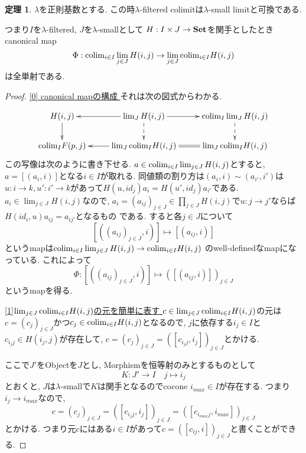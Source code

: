 \documentclass[dvipdfmx,a4paper,11pt]{article}
\newcommand{\colim}{{\rm colim}}
\theoremstyle{definition}
\newtheorem{thm}{定理}
\begin{document}
 \begin{tcolorbox}
 [colback = white, colframe = green!35!black, fonttitle = \bfseries,breakable = true]
\begin{thm}
\label{thm-regular-commute}
$\lambda$を正則基数とする. 
この時$\lambda$-filtered colimitは$\lambda$-small limitと可換である.

つまり$I$を$\lambda$-filtered, $J$を$\lambda$-smallとして
$H : I \times J \to {\bf Set}$を関手としたとき
canonical map
$$
\Phi: \colim_{i \in I} \lim_{j \in J}H(i,j)
\to
\lim_{j \in J}
\colim_{i \in I} H(i,j)
$$
は全単射である. 
\end{thm}
 \end{tcolorbox}

\begin{proof}

\underline{[0] canonical mapの構成 }
それは次の図式からわかる. 

\begin{equation*}
\xymatrix@C=25pt@R=20pt{
H(i,j)\ar@{->}[d]
& \lim_{J} H(i,j)\ar@{-->}[d]\ar@{->}[l]\ar@{->}[r]
&\colim_{I}\lim_{J} H(i,j)\ar@{-->}[d]
\\
\colim_{I}F(p,j)
&\lim_{J}\colim_{I}H(i,j)\ar@{->}[l]
&\lim_{J}\colim_{I}H(i,j)\ar@{=}[l] \\   
}
\end{equation*}
この写像は次のように書き下せる.
$a \in \colim_{i \in I} \lim_{j \in J}H(i,j)$とすると, $a = [(a_i, i)]$となる$i \in I$が取れる.
同値類の割り方は$(a_i, i) \sim (a_{i'}, i')$は$u : i \to k, u' : i' \to k$があって$H(u, id_{j})a_i = H(u', id_{j})a_{i'}$である.
$a_i \in \lim_{j \in J}H(i,j)$なので, 
$a_i =(a_{ij})_{j \in J} \in \prod_{j \in J}H(i,j)$で$u : j \to j'$ならば$H(id_{i}, u)a_{ij} = a_{ij'}$となるもの
である.
すると各$j \in J$について
$$
[((a_{ij})_{j \in J} , i)] \mapsto [(a_{ij}, i)]
$$
というmapは$\colim_{i \in I} \lim_{j \in J}H(i,j) \to \colim_{i \in I} H(i,j)$
のwell-definedなmapになっている. これによって
$$
\Phi : [((a_{ij})_{j \in J} , i)] \mapsto ([(a_{ij}, i)])_{j \in J}
$$
というmapを得る. 

\underline{[1]$\lim_{j \in J}\colim_{i \in I} H(i,j)$の元を簡単に表す } 
$c \in \lim_{j \in J}\colim_{i \in I} H(i,j)$の元は
$c = (c_j)_{j \in J}$かつ$c_j \in \colim_{i \in I} H(i,j)$となるので, 
$j$に依存する$i_{j} \in I$と$c_{i_{j}j} \in H(i_{j},j)$が存在して, 
$c = (c_j)_{j \in J}=([c_{i_{j}j}, i_{j}])_{j \in J}$とかける. 

ここで$J'$をObjectを$J$とし, Morphismを恒等射のみとするものとして
$$
K : J' \to I \quad j \mapsto i_{j}
$$
とおくと, $J$は$\lambda$-smallで$K$は関手となるのでcocone $i_{max} \in I$が存在する.
つまり$i_j \to i_{max}$なので,
 $$
 c = (c_j)_{j \in J}=([c_{i_{j}j}, i_{j}])_{j \in J}
 =([c_{i_{max}j}, i_{max}])_{j \in J}
 $$
 とかける. 
 つまり元$c$にはある$i \in I$があって$c= ([c_{ij}, i])_{j \in J}$と書くことができる. 
 


\end{proof}
\end{document}
